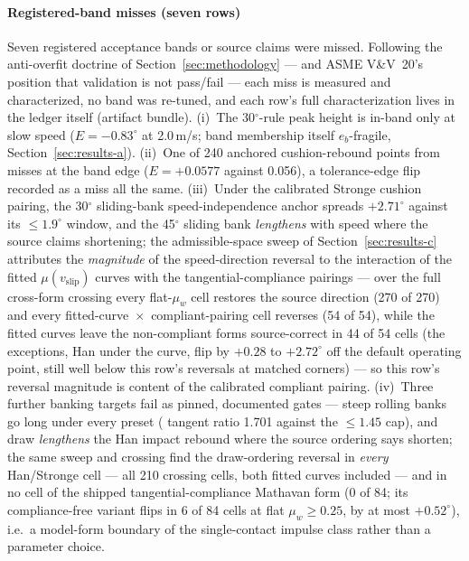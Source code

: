 \paragraph{Registered-band misses (seven rows)}
Seven registered acceptance bands or source claims were missed.
Following the anti-overfit doctrine of Section~\ref{sec:methodology} ---
and ASME V\&V~20's position that validation is not pass/fail
\citep{asme2009vv20} --- each miss is measured and characterized, no
band was re-tuned, and each row's full characterization lives in the
ledger itself (artifact bundle). (i)~The 30$^\circ$-rule peak height is in-band
only at slow speed ($E = -0.83^\circ$ at 2.0\,m/s; band membership
itself $e_b$-fragile, Section~\ref{sec:results-a}). (ii)~One of 240 anchored
cushion-rebound points from \citet{mathavan2010cushion} misses at the
band edge ($E = +0.0577$ against 0.056), a tolerance-edge flip recorded
as a miss all the same.
(iii)~Under the calibrated Stronge cushion pairing, the 30$^\circ$
sliding-bank speed-independence anchor spreads $+2.71^\circ$ against its
$\leq 1.9^\circ$ window, and the 45$^\circ$ sliding bank
\emph{lengthens} with speed where the source claims shortening; the admissible-space sweep of
Section~\ref{sec:results-c} attributes the \emph{magnitude} of the
speed-direction reversal to
the interaction of the fitted $\mu(v_{\mathrm{slip}})$ curves
with the tangential-compliance pairings --- over the full cross-form
crossing every
flat-$\mu_w$ cell restores the source direction (270 of 270) and
every fitted-curve~$\times$~compliant-pairing cell reverses (54 of
54), while the fitted curves leave the non-compliant
forms source-correct in 44 of 54 cells (the exceptions, Han under
the  curve, flip by $+0.28$ to $+2.72^\circ$ off the
default operating point, still well below this row's reversals at
matched corners) --- so this row's reversal magnitude is content of
the
calibrated compliant pairing. (iv)~Three further
banking
targets fail as pinned, documented gates --- steep rolling banks go long
under every preset ( tangent ratio 1.701 against
the $\leq 1.45$ cap), and draw \emph{lengthens} the Han impact rebound
where the source ordering says shorten; the same sweep and
crossing find
the draw-ordering reversal in \emph{every} Han/Stronge cell --- all
210 crossing cells, both fitted curves included --- and in no cell of
the shipped tangential-compliance Mathavan form (0 of 84; its
compliance-free variant flips in 6 of 84 cells at flat
$\mu_w \geq 0.25$, by at most $+0.52^\circ$), i.e.\ a model-form
boundary
of the single-contact impulse class rather than a parameter choice.
